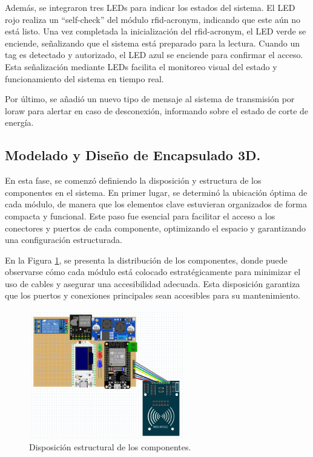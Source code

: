 Además, se integraron tres LEDs para indicar los estados del sistema. El LED rojo realiza un “self-check” del módulo \acrshort{rfid-acronym}, indicando que este aún no está listo. Una vez completada la inicialización del \acrshort{rfid-acronym}, el LED verde se enciende, señalizando que el sistema está preparado para la lectura. Cuando un tag es detectado y autorizado, el LED azul se enciende para confirmar el acceso. Esta señalización mediante LEDs facilita el monitoreo visual del estado y funcionamiento del sistema en tiempo real.

Por último, se añadió un nuevo tipo de mensaje al sistema de transmisión por \acrshort{loraw} para alertar en caso de desconexión, informando sobre el estado de corte de energía.




\subsection{ Modelado y Diseño de Encapsulado 3D.}

En esta fase, se comenzó definiendo la disposición y estructura de los componentes en el sistema. En primer lugar, se determinó la ubicación óptima de cada módulo, de manera que los elementos clave estuvieran organizados de forma compacta y funcional. Este paso fue esencial para facilitar el acceso a los conectores y puertos de cada componente, optimizando el espacio y garantizando una configuración estructurada.

En la Figura \ref{fig:diseño}, se presenta la distribución de los componentes, donde puede observarse cómo cada módulo está colocado estratégicamente para minimizar el uso de cables y asegurar una accesibilidad adecuada. Esta disposición garantiza que los puertos y conexiones principales sean accesibles para su mantenimiento.


\begin{figure}[H]
\leavevmode
\begin{minipage}{\textwidth}
\begin{center}
\includegraphics[width=0.6\textwidth]{./capitulo_04/imagen/disposicion.png}
\caption{Disposición estructural de los componentes.\label{fig:diseño}}
\end{center}
\end{minipage}
\end{figure}



